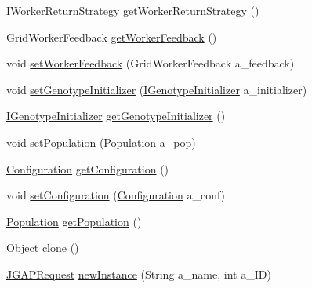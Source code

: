 \begin{DoxyCompactItemize}
\item 
\hyperlink{interfaceorg_1_1jgap_1_1distr_1_1grid_1_1_i_worker_return_strategy}{I\-Worker\-Return\-Strategy} \hyperlink{classorg_1_1jgap_1_1distr_1_1grid_1_1_j_g_a_p_request_a16e7f8123c613ffdd4d39e4eff66b661}{get\-Worker\-Return\-Strategy} ()
\item 
Grid\-Worker\-Feedback \hyperlink{classorg_1_1jgap_1_1distr_1_1grid_1_1_j_g_a_p_request_accae8684ccbfd5e48da7ee30eae81917}{get\-Worker\-Feedback} ()
\item 
void \hyperlink{classorg_1_1jgap_1_1distr_1_1grid_1_1_j_g_a_p_request_a35798e3903904777a003682afc0dff05}{set\-Worker\-Feedback} (Grid\-Worker\-Feedback a\-\_\-feedback)
\item 
void \hyperlink{classorg_1_1jgap_1_1distr_1_1grid_1_1_j_g_a_p_request_a8cd0d9e55a1ed0c75cf76e424c8837e4}{set\-Genotype\-Initializer} (\hyperlink{interfaceorg_1_1jgap_1_1distr_1_1grid_1_1_i_genotype_initializer}{I\-Genotype\-Initializer} a\-\_\-initializer)
\item 
\hyperlink{interfaceorg_1_1jgap_1_1distr_1_1grid_1_1_i_genotype_initializer}{I\-Genotype\-Initializer} \hyperlink{classorg_1_1jgap_1_1distr_1_1grid_1_1_j_g_a_p_request_af2bd54e3e1c033ddf9c0bfd4b29f495c}{get\-Genotype\-Initializer} ()
\item 
void \hyperlink{classorg_1_1jgap_1_1distr_1_1grid_1_1_j_g_a_p_request_a8da7acef4f9382d1743edc5e784f1823}{set\-Population} (\hyperlink{classorg_1_1jgap_1_1_population}{Population} a\-\_\-pop)
\item 
\hyperlink{classorg_1_1jgap_1_1_configuration}{Configuration} \hyperlink{classorg_1_1jgap_1_1distr_1_1grid_1_1_j_g_a_p_request_acd56aa9736ff3ee0288df3afec1ca1b3}{get\-Configuration} ()
\item 
void \hyperlink{classorg_1_1jgap_1_1distr_1_1grid_1_1_j_g_a_p_request_a61c1fc45048bcbe08669071333508f35}{set\-Configuration} (\hyperlink{classorg_1_1jgap_1_1_configuration}{Configuration} a\-\_\-conf)
\item 
\hyperlink{classorg_1_1jgap_1_1_population}{Population} \hyperlink{classorg_1_1jgap_1_1distr_1_1grid_1_1_j_g_a_p_request_a554829ef5ab13382e91918f494459780}{get\-Population} ()
\item 
Object \hyperlink{classorg_1_1jgap_1_1distr_1_1grid_1_1_j_g_a_p_request_a73d3e3e9c3a5b8b7c17be890fa665e64}{clone} ()
\item 
\hyperlink{classorg_1_1jgap_1_1distr_1_1grid_1_1_j_g_a_p_request}{J\-G\-A\-P\-Request} \hyperlink{classorg_1_1jgap_1_1distr_1_1grid_1_1_j_g_a_p_request_a4ee3cacfb06afe6a2ebac82c11296742}{new\-Instance} (String a\-\_\-name, int a\-\_\-\-I\-D)
\end{DoxyCompactItemize}
